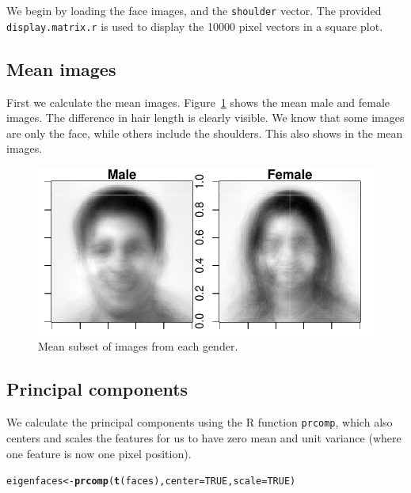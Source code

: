 \documentclass[a4paper]{article}\usepackage[]{graphicx}\usepackage[]{color}
\makeatletter
\def\maxwidth{ %
  \ifdim\Gin@nat@width>\linewidth
    \linewidth
  \else
    \Gin@nat@width
  \fi
}
\newcommand{\hlnum}[1]{\textcolor[rgb]{0.686,0.059,0.569}{#1}}%
\newcommand{\hlstd}[1]{\textcolor[rgb]{0.345,0.345,0.345}{#1}}%
\newcommand{\hlkwb}[1]{\textcolor[rgb]{0.69,0.353,0.396}{#1}}%
\newcommand{\hlkwc}[1]{\textcolor[rgb]{0.333,0.667,0.333}{#1}}%
\newcommand{\hlkwd}[1]{\textcolor[rgb]{0.737,0.353,0.396}{\textbf{#1}}}%
\newenvironment{kframe}{%
 \def\at@end@of@kframe{}%
 \ifinner\ifhmode%
  \def\at@end@of@kframe{\end{minipage}}%
  \begin{minipage}{\columnwidth}%
 \fi\fi%
 \def\FrameCommand##1{\hskip\@totalleftmargin \hskip-\fboxsep
 \colorbox{shadecolor}{##1}\hskip-\fboxsep
     \hskip-\linewidth \hskip-\@totalleftmargin \hskip\columnwidth}%
 \MakeFramed {\advance\hsize-\width
   \@totalleftmargin\z@ \linewidth\hsize
   \@setminipage}}%
 {\par\unskip\endMakeFramed%
 \at@end@of@kframe}
\newenvironment{knitrout}{}{} %
\makeatother
\begin{document}
We begin by loading the face images, and the \texttt{shoulder} vector. The provided \texttt{display.matrix.r} is used to display the 10000 pixel vectors in a square plot.

\subsection{Mean images}

First we calculate the mean images. Figure~\ref{fig:mean_gender} shows the mean male and female images. The difference in hair length is clearly visible. We know that some images are only the face, while others include the shoulders. This also shows in the mean images.
\begin{knitrout}
\color{fgcolor}\begin{figure}
\includegraphics[width=\maxwidth]{figure/mean_gender-1} \caption[Mean subset of images from each gender]{Mean subset of images from each gender.}\label{fig:mean_gender}
\end{figure}


\end{knitrout}

\subsection{Principal components}

We calculate the principal components using the R function \texttt{prcomp}, which also centers and scales the features for us to have zero mean and unit variance (where one feature is now one pixel position). 
\begin{knitrout}
\color{fgcolor}\begin{kframe}
\begin{alltt}
\hlstd{eigenfaces} \hlkwb{<-} \hlkwd{prcomp}\hlstd{(}\hlkwd{t}\hlstd{(faces),} \hlkwc{center}\hlstd{=}\hlnum{TRUE}\hlstd{,} \hlkwc{scale}\hlstd{=}\hlnum{TRUE}\hlstd{)}
\end{alltt}
\end{kframe}
\end{knitrout}
\end{document}
